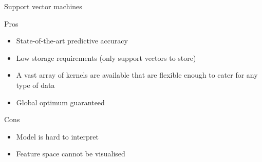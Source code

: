 \documentclass[pdf]{beamer}
\begin{document}
\begin{frame}{Support vector machines}
\begin{exampleblock}{Pros}
\begin{itemize}
	\item State-of-the-art predictive accuracy
	\item Low storage requirements (only support vectors to store)
	\item A vast array of kernels are available that are flexible enough to cater for any type of data
	\item Global optimum guaranteed
\end{itemize}
\end{exampleblock}
\vfill
\begin{alertblock}{Cons}
\begin{itemize}
	\item Model is hard to interpret
	\item Feature space cannot be visualised
\end{itemize}
\end{alertblock}
\end{frame}

\end{document}
